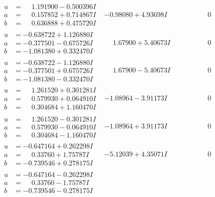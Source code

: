 \documentclass[1p]{elsarticle_modified}
\theoremstyle{definition}
\begin{document}
$$\begin{array}{c|c|c}
\begin{aligned}
u &= \phantom{-}1.191900 - 0.500396 I \\
a &= \phantom{-}0.157852 + 0.714867 I \\
b &= \phantom{-}0.636888 + 0.475720 I\end{aligned}
 & -0.98080 + 4.93698 I & \phantom{-0.000000 } 0 \\ \hline\begin{aligned}
u &= -0.638722 + 1.126880 I \\
a &= -0.377501 - 0.675726 I \\
b &= -1.081380 + 0.332470 I\end{aligned}
 & \phantom{-}1.67900 + 5.40673 I & \phantom{-0.000000 } 0 \\ \hline\begin{aligned}
u &= -0.638722 - 1.126880 I \\
a &= -0.377501 + 0.675726 I \\
b &= -1.081380 - 0.332470 I\end{aligned}
 & \phantom{-}1.67900 - 5.40673 I & \phantom{-0.000000 } 0 \\ \hline\begin{aligned}
u &= \phantom{-}1.261520 + 0.301281 I \\
a &= \phantom{-}0.579930 + 0.064910 I \\
b &= \phantom{-}0.304684 + 1.160470 I\end{aligned}
 & -1.08964 - 3.91173 I & \phantom{-0.000000 } 0 \\ \hline\begin{aligned}
u &= \phantom{-}1.261520 - 0.301281 I \\
a &= \phantom{-}0.579930 - 0.064910 I \\
b &= \phantom{-}0.304684 - 1.160470 I\end{aligned}
 & -1.08964 + 3.91173 I & \phantom{-0.000000 } 0 \\ \hline\begin{aligned}
u &= -0.647164 + 0.262298 I \\
a &= \phantom{-}0.33760 + 1.75787 I \\
b &= -0.739546 + 0.278175 I\end{aligned}
 & -5.12039 + 4.35071 I & \phantom{-0.000000 } 0 \\ \hline\begin{aligned}
u &= -0.647164 - 0.262298 I \\
a &= \phantom{-}0.33760 - 1.75787 I \\
b &= -0.739546 - 0.278175 I\end{aligned}

\end{array}$$
\end{document}
